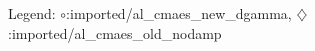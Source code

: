 Legend: {\color{NavyBlue}$\circ$}:imported/al\_cmaes\_new\_dgamma, {\color{Magenta}$\diamondsuit$}:imported/al\_cmaes\_old\_nodamp